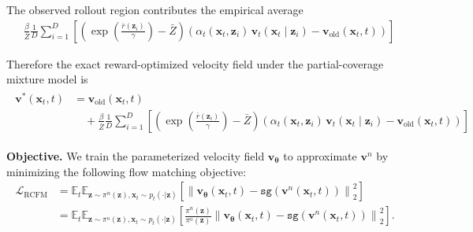 \documentclass{article} %
\begin{document}
The observed rollout region contributes the empirical average
\begin{align}
    &\frac{\beta}{\bar{Z}}
    \frac{1}{D}
    \sum_{i=1}^{D}
    \left[
        \left(
            \exp\!\left( \frac{\bar{r}(\mathbf{z}_i)}{\gamma} \right)
            -
            \bar{Z}
        \right)
        \left(
            \alpha_t(\mathbf{x}_t, \mathbf{z}_i)\,
            \mathbf{v}_t(\mathbf{x}_t \mid \mathbf{z}_i)
            -
            \mathbf{v}_{\mathrm{old}}(\mathbf{x}_t, t)
        \right)
    \right]
\end{align}

Therefore the exact reward-optimized velocity field under the partial-coverage mixture model is
\begin{align}
    \boxed{
    \begin{aligned}
        \mathbf{v}^*(\mathbf{x}_t, t)
        &=
        \mathbf{v}_{\mathrm{old}}(\mathbf{x}_t, t)
        \\
        &\quad
        +
        \frac{\beta}{\bar{Z}}
        \frac{1}{D}
        \sum_{i=1}^{D}
        \left[
            \left(
                \exp\!\left( \frac{\bar{r}(\mathbf{z}_i)}{\gamma} \right)
                -
                \bar{Z}
            \right)
            \left(
                \alpha_t(\mathbf{x}_t, \mathbf{z}_i)\,
                \mathbf{v}_t(\mathbf{x}_t \mid \mathbf{z}_i)
                -
                \mathbf{v}_{\mathrm{old}}(\mathbf{x}_t, t)
            \right)
        \right]
    \end{aligned}
    }
\end{align}



\noindent\textbf{Objective.}
We train the parameterized velocity field $\mathbf v_{\boldsymbol{\theta}}$
to approximate $\mathbf v^n$ by minimizing the following flow matching
objective:
\begin{align}
\mathcal{L}_{\mathrm{RCFM}}
&=
\mathbb E_t
\mathbb E_{
\mathbf z\sim\pi^n(\mathbf z),
\mathbf x_t\sim p_t(\cdot|\mathbf z)
}
\left[
\left\|
\mathbf v_{\boldsymbol{\theta}}(\mathbf x_t,t)
-
\mathtt{sg}(\mathbf v^n(\mathbf x_t,t))
\right\|_2^2
\right]\\
&=
\mathbb E_t
\mathbb E_{
\mathbf z\sim\pi^{\mathrm{o}}(\mathbf z),
\mathbf x_t\sim p_t(\cdot|\mathbf z)
}
\left[
\frac{\pi^n(\mathbf z)}
{\pi^{\mathrm{o}}(\mathbf z)}
\left\|
\mathbf v_{\boldsymbol{\theta}}(\mathbf x_t,t)
-
\mathtt{sg}(
\mathbf v^n(\mathbf x_t,t))
\right\|_2^2
\right].
\end{align}
\end{document}
